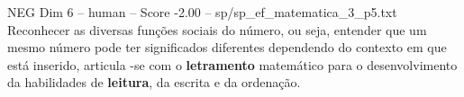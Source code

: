 \begin{textsample}{NEG Dim 6 – human – Score -2.00 – sp/sp\_ef\_matematica\_3\_p5.txt}  \label{ex:f6_neg_011}
Reconhecer as diversas funções sociais do número, ou seja, entender que um mesmo número pode ter significados diferentes dependendo do contexto em que está inserido, articula -se com o \textbf{letramento} matemático para o desenvolvimento da habilidades de \textbf{leitura}, da escrita e da ordenação.

\end{textsample}
